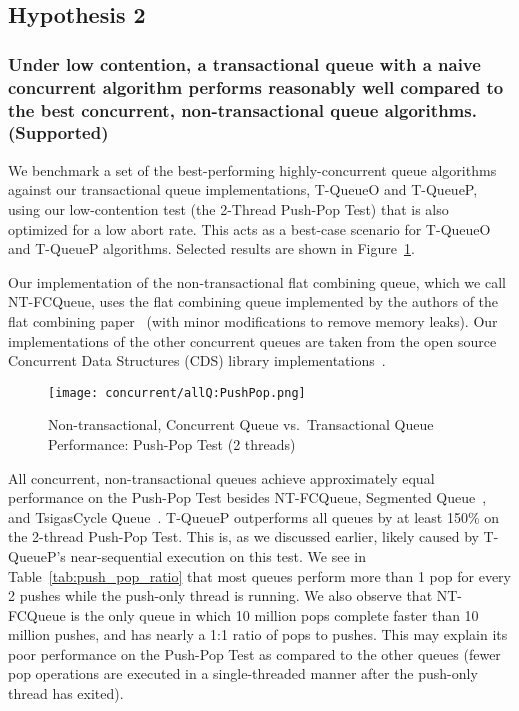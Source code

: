 \subsection{Hypothesis 2}
\subsubsection{Under low contention, a transactional queue with a naive concurrent algorithm performs reasonably well compared to the best concurrent, non-transactional queue algorithms. (Supported)}

We benchmark a set of the best-performing highly-concurrent queue algorithms against our transactional queue implementations, T-QueueO and T-QueueP, using our low-contention test (the 2-Thread Push-Pop Test) that is also optimized for a low abort rate. This acts as a best-case scenario for T-QueueO and T-QueueP algorithms. Selected results are shown in Figure~\ref{fig:ntqs_pp}.

Our implementation of the non-transactional flat combining queue, which we call NT-FCQueue, uses the flat combining queue implemented by the authors of the flat combining paper~\cite{flatcombining} (with minor modifications to remove memory leaks). Our implementations of the other concurrent queues are taken from the open source Concurrent Data Structures (CDS) library implementations~\cite{libcds}. 

\begin{figure}[t!]
    \centering
	\begin{minipage}{\textwidth}
        {\texttt{[image: concurrent/allQ:PushPop.png]}}
	\end{minipage}
    \caption{Non-transactional, Concurrent Queue vs.\ Transactional Queue Performance: Push-Pop Test (2 threads)}
    \label{fig:ntqs_pp}
\end{figure}

All concurrent, non-transactional queues achieve approximately equal performance on the Push-Pop Test besides NT-FCQueue, Segmented Queue~\cite{queue4}, and TsigasCycle Queue~\cite{queue5}. 
T-QueueP outperforms all queues by at least 150\% on the 2-thread Push-Pop Test. This is, as we discussed earlier, likely caused by T-QueueP's near-sequential execution on this test. We see in Table~\ref{tab:push_pop_ratio} that most queues perform more than 1 pop for every 2 pushes while the push-only thread is running. We also observe that NT-FCQueue is the only queue in which 10 million pops complete faster than 10 million pushes, and has nearly a 1:1 ratio of pops to pushes. This may explain its poor performance on the Push-Pop Test as compared to the other queues (fewer pop operations are executed in a single-threaded manner after the push-only thread has exited).

